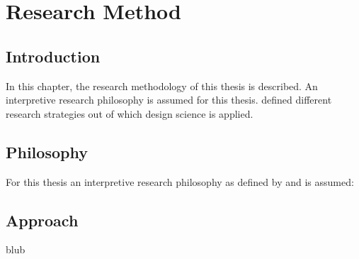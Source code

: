
\chapter{Research Method} %

\label{Research Method} %


\section{Introduction}

In this chapter, the research methodology of this thesis is described. An interpretive research philosophy is assumed for this thesis. \cite{Hevner2010} defined different research strategies out of which design science is applied.



\section{Philosophy}

For this thesis an interpretive research philosophy as defined by \cite{Vaishnavi2007} and \cite{Saunders2009} is assumed:




\section{Approach}

blub




